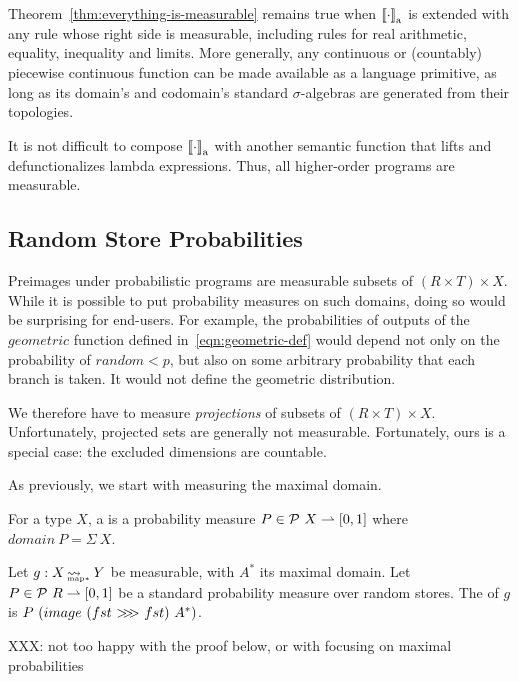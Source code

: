 \documentclass[preprint]{sigplanconf}
\newcommand{\arrow}{\rightsquigarrow}
\newcommand{\pto}{\rightharpoonup}
\newcommand{\arrowcomp}{\ensuremath{{>}\mspace{-6mu}{>}\mspace{-6mu}{>}}}
\newcommand{\gen}{_\mathrm{a}}
\DeclareMathOperator{\pmapto}{\arrow_{\mspace{-22mu}_{\mathrm{map*}}}}
\begin{document}
Theorem~\ref{thm:everything-is-measurable} remains true when $\meaningof{\cdot}\gen$ is extended with any rule whose right side is measurable, including rules for real arithmetic, equality, inequality and limits.
More generally, any continuous or (countably) piecewise continuous function can be made available as a language primitive, as long as its domain's and codomain's standard $\sigma$-algebras are generated from their topologies.

It is not difficult to compose $\meaningof{\cdot}\gen$ with another semantic function that lifts and defunctionalizes lambda expressions.
Thus, all higher-order programs are measurable.

\subsection{Random Store Probabilities}

Preimages under probabilistic programs are measurable subsets of $(R \times T) \times X$.
While it is possible to put probability measures on such domains, doing so would be surprising for end-users.
For example, the probabilities of outputs of the $geometric$ function defined in~\eqref{eqn:geometric-def} would depend not only on the probability of $random < p$, but also on some arbitrary probability that each branch is taken.
It would not define the geometric distribution.

We therefore have to measure \emph{projections} of subsets of $(R \times T) \times X$.
Unfortunately, projected sets are generally not measurable.
Fortunately, ours is a special case: the excluded dimensions are countable.

As previously, we start with measuring the maximal domain.

\begin{definition}
For a type $X$, a  is a probability measure $P \in \powerset~X \pto [0,1]$ where $domain~P = \Sigma~X$.
\end{definition}

\begin{definition}
Let $g : X \pmapto Y$ be measurable, with $A^*$ its maximal domain.
Let $P \in \powerset~R \pto [0,1]$ be a standard probability measure over random stores.
The  of $g$ is $P~(image~(fst~\arrowcomp~fst)~A^*)$.
\end{definition}

XXX: not too happy with the proof below, or with focusing on maximal probabilities
\end{document}
